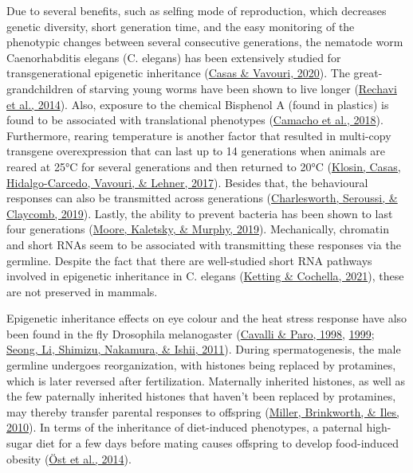 \documentclass[12pt,twoside]{reedthesis}
\begin{document}
Due to several benefits, such as selfing mode of reproduction, which
decreases genetic diversity, short generation time, and the easy
monitoring of the phenotypic changes between several consecutive
generations, the nematode worm Caenorhabditis elegans (C. elegans) has
been extensively studied for transgenerational epigenetic inheritance
(\protect\hyperlink{ref-casas2020}{Casas \& Vavouri, 2020}). The great-grandchildren of starving young worms have been
shown to live longer (\protect\hyperlink{ref-rechavi2014}{Rechavi et al., 2014}). Also, exposure to the chemical
Bisphenol A (found in plastics) is found to be associated with
translational phenotypes (\protect\hyperlink{ref-camacho2018}{Camacho et al., 2018}). Furthermore, rearing
temperature is another factor that resulted in multi-copy transgene
overexpression that can last up to 14 generations when animals are
reared at 25°C for several generations and then returned to 20°C
(\protect\hyperlink{ref-klosin2017}{Klosin, Casas, Hidalgo-Carcedo, Vavouri, \& Lehner, 2017}). Besides that, the behavioural responses can also be
transmitted across generations (\protect\hyperlink{ref-charlesworth2019}{Charlesworth, Seroussi, \& Claycomb, 2019}). Lastly, the ability
to prevent bacteria has been shown to last four generations
(\protect\hyperlink{ref-moore2019}{Moore, Kaletsky, \& Murphy, 2019}). Mechanically, chromatin and short RNAs seem to be
associated with transmitting these responses via the germline. Despite
the fact that there are well-studied short RNA pathways involved in
epigenetic inheritance in C. elegans (\protect\hyperlink{ref-ketting2021}{Ketting \& Cochella, 2021}), these are not
preserved in mammals.

Epigenetic inheritance effects on eye colour and the heat stress
response have also been found in the fly Drosophila melanogaster
(\protect\hyperlink{ref-cavalli1998}{Cavalli \& Paro, 1998}, \protect\hyperlink{ref-cavalli1999}{1999}; \protect\hyperlink{ref-seong2011}{Seong, Li, Shimizu, Nakamura, \& Ishii, 2011}). During spermatogenesis, the
male germline undergoes reorganization, with histones being replaced by
protamines, which is later reversed after fertilization. Maternally
inherited histones, as well as the few paternally inherited histones
that haven't been replaced by protamines, may thereby transfer parental
responses to offspring (\protect\hyperlink{ref-miller2010}{Miller, Brinkworth, \& Iles, 2010}). In terms of the inheritance of
diet-induced phenotypes, a paternal high-sugar diet for a few days
before mating causes offspring to develop food-induced obesity
(\protect\hyperlink{ref-uxf6st2014}{Öst et al., 2014}).
\end{document}
